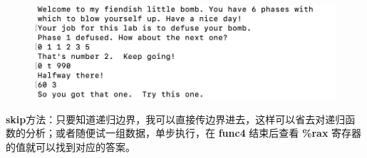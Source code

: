 \begin{enumerate}
                \begin{figure}[htbp]
                    \hspace*{2cm}
                    \includegraphics*[width = 12cm]{s4_7.png}
                \end{figure}
        \end{enumerate}
        \par \textbf{skip}方法：只要知道递归边界，我可以直接传边界进去，这样可以省去对递归函数的分析；或者随便试一组数据，单步执行，在 \textbf{func4} 结束后查看 \textbf{\%rax} 寄存器的值就可以找到对应的答案。
